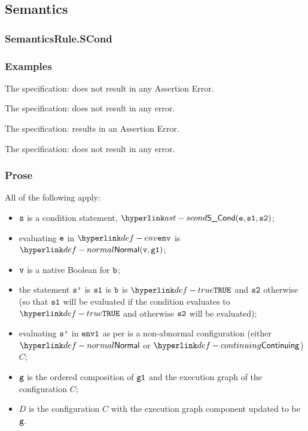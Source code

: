 \subsection{Semantics}
\subsubsection{SemanticsRule.SCond\label{sec:SemanticsRule.SCond}}
\subsubsection{Examples}
The specification:
does not result in any Assertion Error.

The specification:
does not result in any error.

The specification:
results in an Assertion Error.

The specification:
does not result in any error.

\subsubsection{Prose}
All of the following apply:
\begin{itemize}
\item $\texttt{s}$ is a condition statement, $\SCond(\ve, \vsone, \vstwo)$;
\item evaluating $\texttt{e}$ in $\env$ is $\Normal(\vv, \vgone)$\ProseOrAbnormal;
\item $\texttt{v}$ is a native Boolean for $\texttt{b}$;
\item the statement $\texttt{s'}$ is $\texttt{s1}$ is $\texttt{b}$ is $\True$ and $\texttt{s2}$ otherwise
(so that $\texttt{s1}$ will be evaluated if the condition evaluates to $\True$ and otherwise
$\texttt{s2}$ will be evaluated);
\item evaluating $\texttt{s'}$ in $\texttt{env1}$ as per  is a non-abnormal configuration
      (either $\Normal$ or $\Continuing$) $C$\ProseOrAbnormal;
\item $\texttt{g}$ is the ordered composition of $\texttt{g1}$ and the execution graph of the configuration $C$;
\item $D$ is the configuration $C$ with the execution graph component updated to be $\texttt{g}$.
\end{itemize}

